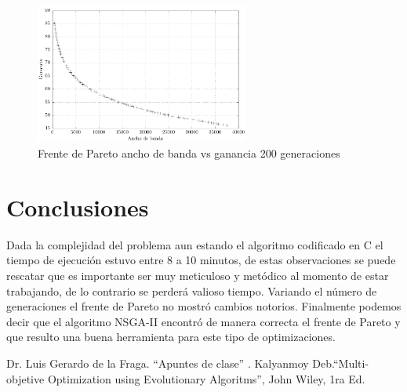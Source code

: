 \documentclass[conference]{IEEEtran}
\begin{document}
\begin{figure}[hbtp]
\centering
\includegraphics[width=7cm]{200.pdf}
\caption{Frente de Pareto ancho de banda vs ganancia 200 generaciones}
\label{fig:tanaka3}
\end{figure}



\section{Conclusiones}

Dada la complejidad del problema aun estando el algoritmo codificado en C el tiempo de ejecución estuvo entre 8 a 10 minutos, de estas observaciones se puede rescatar que es importante ser muy meticuloso y metódico al momento de estar trabajando, de lo contrario se perderá valioso tiempo. Variando el número de generaciones el frente de Pareto no mostró cambios notorios. Finalmente podemos decir que el algoritmo NSGA-II encontró de manera correcta el frente de Pareto y que resulto una buena herramienta para este tipo de optimizaciones.

\begin{thebibliography}{00}
  Dr. Luis Gerardo de la Fraga. ``Apuntes de clase'' .
 Kalyanmoy Deb.``Multi-objetive Optimization using Evolutionary Algoritms'', John Wiley, 1ra Ed.
\end{thebibliography}
\end{document}
